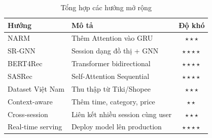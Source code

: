 \documentclass[12pt, a4paper]{article}
\begin{document}
\begin{table}[H]
\centering
\caption{Tổng hợp các hướng mở rộng}
\label{tab:future_work}
\begin{tabular}{llc}
\toprule
\textbf{Hướng} & \textbf{Mô tả} & \textbf{Độ khó} \\
\midrule
NARM & Thêm Attention vào GRU & $\star\star\star$ \\
SR-GNN & Session dạng đồ thị + GNN & $\star\star\star\star$ \\
BERT4Rec & Transformer bidirectional & $\star\star\star\star$ \\
SASRec & Self-Attention Sequential & $\star\star\star\star$ \\
Dataset Việt Nam & Thu thập từ Tiki/Shopee & $\star\star\star$ \\
Context-aware & Thêm time, category, price & $\star\star$ \\
Cross-session & Liên kết nhiều session cùng user & $\star\star\star$ \\
Real-time serving & Deploy model lên production & $\star\star\star\star$ \\
\bottomrule
\end{tabular}
\end{table}

\newpage
\end{document}
